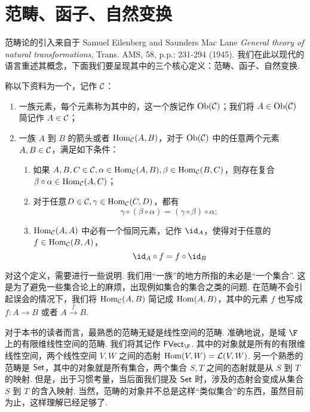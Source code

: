 \section{范畴、函子、自然变换}

范畴论的引入来自于 Samuel Eilenberg and Saunders Mac Lane \emph{General theory of natural transformations}, Trans. AMS, 58, p.p.: 231-294 (1945). 我们在此以现代的语言重述其概念，下面我们要呈现其中的三个核心定义：范畴、函子、自然变换.

\begin{definition}{}{}
    称以下资料为一个，记作 $\mathcal{C}$：
    \begin{enumerate}
        \item 一族元素，每个元素称为其中的，这一个族记作 $\mathop\mathrm{Ob}(\mathcal{C})$；我们将 $A \in \mathop\mathrm{Ob}(\mathcal{C})$ 简记作 $A \in \mathcal{C}$；
        \item 一族 $A$ 到 $B$ 的箭头或者 $\mathop\mathrm{Hom}_{\mathcal{C}} (A, B)$，对于 $\mathop\mathrm{Ob}(\mathcal{C})$ 中的任意两个元素 $A, B \in \mathcal{C}$，满足如下条件：
        \begin{enumerate}
            \item 如果 $A, B, C \in \mathcal{C}, \alpha \in \mathop\mathrm{Hom}_{\mathcal{C}} (A, B), \beta \in \mathop\mathrm{Hom}_{\mathcal{C}} (B, C)$，则存在复合 $\beta \circ \alpha \in \mathop\mathrm{Hom}_{\mathcal{C}}(A, C)$；
            \item 对于任意$D \in \mathcal{C}, \gamma \in \mathop\mathrm{Hom}_{\mathcal{C}} (C, D)$，都有\[
                \gamma \circ (\beta \circ \alpha)= (\gamma \circ \beta) \circ \alpha;
            \]
            \item $\mathop\mathrm{Hom}_{\mathcal{C}} (A, A)$ 中必有一个恒同元素，记作 $\id_A$，使得对于任意的$f \in \mathop\mathrm{Hom}_{\mathcal{C}} (B, A)$，
            \[\id_A \circ f = f \circ \id_B \]
        \end{enumerate}
    \end{enumerate}
\end{definition}

对这个定义，需要进行一些说明. 我们用“一族”的地方所指的未必是“一个集合”. 这是为了避免一些集合论上的麻烦，出现例如集合的集合之类的问题. 在范畴不会引起误会的情况下，我们将 $\mathop\mathrm{Hom}_{\mathcal{C}} (A, B)$ 简记成 $\mathop\mathrm{Hom} (A, B)$，其中的元素 $f$ 也写成 $f: A \to B$ 或者 $A \stackrel{f}{\to} B$.

对于本书的读者而言，最熟悉的范畴无疑是线性空间的范畴. 准确地说，是域 $\F$ 上的有限维线性空间的范畴. 我们将其记作 $\FVect_\F$. 其中的对象就是所有的有限维线性空间，两个线性空间 $V, W$ 之间的态射 $\mathop\mathrm{Hom} (V, W) = \mathcal{L}(V, W)$. 另一个熟悉的范畴是 $\mathsf{Set}$，其中的对象就是所有集合，两个集合 $S, T$ 之间的态射就是从 $S$ 到 $T$ 的映射. 但是，出于习惯考量，当后面我们提及 $\mathsf{Set}$ 时，涉及的态射会变成从集合 $S$ 到 $T$ 的含入映射. 当然，范畴的对象并不总是这样“类似集合”的东西，虽然目前为止，这样理解已经足够了.

